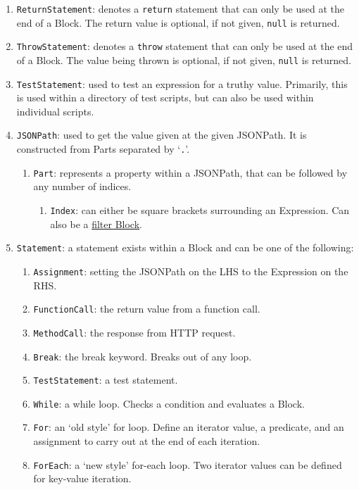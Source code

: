 \begin{enumerate}
    \item \verb|ReturnStatement|: denotes a \verb|return| statement that can only be used at the end of a Block. The return value is optional, if not given, \verb|null| is returned.
    \item \verb|ThrowStatement|: denotes a \verb|throw| statement that can only be used at the end of a Block. The value being thrown is optional, if not given, \verb|null| is returned.
    \item \verb|TestStatement|: used to test an expression for a truthy value. Primarily, this is used within a directory of test scripts, but can also be used within individual scripts.
    \item \verb|JSONPath|: used to get the value given at the given JSONPath. It is constructed from Parts separated by `\verb|.|'.
    \begin{enumerate}
        \item \verb|Part|: represents a property within a JSONPath, that can be followed by any number of indices.
        \begin{enumerate}
            \item \verb|Index|: can either be square brackets surrounding an Expression. Can also be a \hyperref[sec:hello-sttp-jsonpath-filter]{filter Block}.
        \end{enumerate}
    \end{enumerate}
    \item \verb|Statement|: a statement exists within a Block and can be one of the following:
    \begin{enumerate}
        \item \verb|Assignment|: setting the JSONPath on the LHS to the Expression on the RHS.
        \item \verb|FunctionCall|: the return value from a function call.
        \item \verb|MethodCall|: the response from HTTP request.
        \item \verb|Break|: the break keyword. Breaks out of any loop.
        \item \verb|TestStatement|: a test statement.
        \item \verb|While|: a while loop. Checks a condition and evaluates a Block.
        \item \verb|For|: an `old style' for loop. Define an iterator value, a predicate, and an assignment to carry out at the end of each iteration.
        \item \verb|ForEach|: a `new style' for-each loop. Two iterator values can be defined for key-value iteration.

\end{enumerate}
\end{enumerate}
